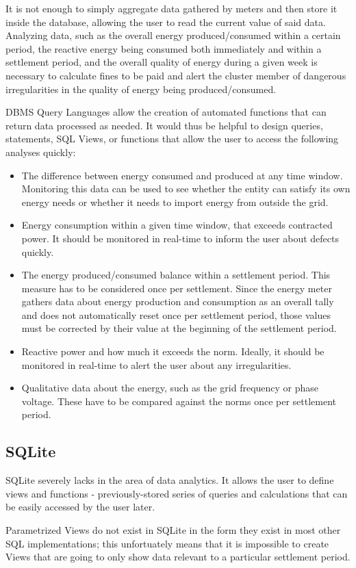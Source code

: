 \par It is not enough to simply aggregate data gathered by meters and then store it inside the database, allowing the user to read the current value of said data. Analyzing data, such as the overall energy produced/consumed within a certain period, the reactive energy being consumed both immediately and within a settlement period, and the overall quality of energy during a given week is necessary to calculate fines to be paid and alert the cluster member of dangerous irregularities in the quality of energy being produced/consumed.
\par DBMS Query Languages allow the creation of automated functions that can return data processed as needed. It would thus be helpful to design queries, statements, SQL Views, or functions that allow the user to access the following analyses quickly:
\begin{itemize}
  \item The difference between energy consumed and produced at any time window. Monitoring this data can be used to see whether the entity can satisfy its own energy needs or whether it needs to import energy from outside the grid.
  \item Energy consumption within a given time window, that exceeds contracted power. It should be monitored in real-time to inform the user about defects quickly.
  \item The energy produced/consumed balance within a settlement period. This measure has to be considered once per settlement. Since the energy meter gathers data about energy production and consumption as an overall tally and does not automatically reset once per settlement period, those values must be corrected by their value at the beginning of the settlement period.
  \item Reactive power and how much it exceeds the norm. Ideally, it should be monitored in real-time to alert the user about any irregularities.
  \item Qualitative data about the energy, such as the grid frequency or phase voltage. These have to be compared against the norms once per settlement period. 
\end{itemize}

\subsection{SQLite}
\par SQLite severely lacks in the area of data analytics. It allows the user to define views and functions - previously-stored series of queries and calculations that can be easily accessed by the user later.

\par Parametrized Views do not exist in SQLite in the form they exist in most other SQL implementations; this unfortuately means that it is impossible to create Views that are going to only show data relevant to a particular settlement period.

